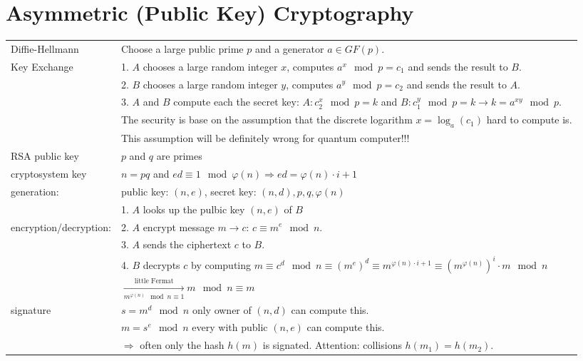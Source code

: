 \section{Asymmetric (Public Key) Cryptography}
\label{sec::CrypCod_Asymmetric Crypto}
\begin{tabular}{|l| p{14.7cm}|}
	\hline
	Diffie-Hellmann				 	& 	Choose a large public prime $p$ and a generator $a \in GF(p)$.\\
	Key Exchange					&	1. $A$ chooses a large random integer $x$, computes $a^x \mod p = c_1$ and sends the result to $B$. \\
									&	2. $B$ chooses a large random integer $y$, computes $a^y \mod p = c_2$ and sends the result to $A$. \\
									&	3. $A$ and $B$ compute each the secret key: $A: c_2^x \mod p=k $ and $B: c_1^y \mod p=k \to k=a^{xy} \mod p$.\\
									& 	The security is base on the assumption that the discrete logarithm $x=\log_{a}(c_1)$ hard to compute is.\\
									&	This assumption will be definitely wrong for quantum computer!!!\\
	\hline
	RSA public key 					&	$p$ and $q$ are primes \\
	cryptosystem key				&	$n=pq$ and $ed\equiv 1 \mod \varphi(n) \Rightarrow e d = \varphi(n) \cdot i + 1$\\
	generation:						&	public key: $(n,e)$, secret key: $(n,d), p,q, \varphi(n)$\\
									\cline{2-2}
									&	1. $A$ looks up the pulbic key $(n,e)$ of $B$\\
	encryption/decryption:			&	2. $A$ encrypt message $m \to c$: $c \equiv m^e \mod n$.\\
									&	3. $A$ sends the ciphertext $c$ to $B$.\\
									&	4. $B$ decrypts $c$ by computing $m\equiv c^d \mod n \equiv (m^{e})^d \equiv  m^{\varphi(n) \cdot i + 1} \equiv  \left(m^{\varphi(n)}\right)^i \cdot m \mod n$\\
									&	$\xrightarrow[m^{\varphi(n)} \mod n\equiv 1]{\text{little Fermat}} m \mod n \equiv m $\\
									\cline{2-2}
	signature						&	$s=m^d \mod n$ only owner of $(n,d)$ can compute this.\\
									&	$m=s^e \mod n$ every with public $(n,e)$ can compute this.\\
									&	$\Rightarrow$ often only the hash $h(m)$ is signated. Attention: 
										collisions $h(m_1)=h(m_2)$.\\
	\hline
\end{tabular}